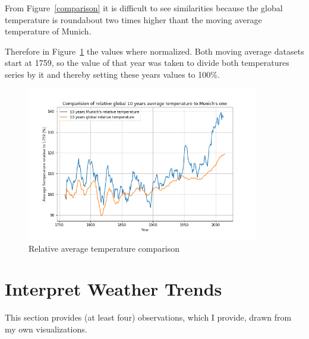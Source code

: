 \documentclass[DIV=11, a4paper, parskip=true]{scrartcl}
\begin{document}
From Figure~\ref{comparison} it is difficult to see similarities because the global temperature
is roundabout two times higher thant the moving average temperature of Munich.

Therefore in Figure~\ref{rel_comparison} the values where normalized. Both moving average
datasets start at 1759, so the value of that year was taken to divide both temperatures series
by it and thereby setting these years values to 100\%.

\begin{figure}[H]
    \centering
    \includegraphics[width=0.9\textwidth]{rel_comparison_average_temperatures.png}
    \caption{Relative average temperature comparison}
    \label{rel_comparison}
\end{figure}

\section{Interpret Weather Trends}

This section provides (at least four) observations, which I provide, drawn from my own
visualizations.
\end{document}
